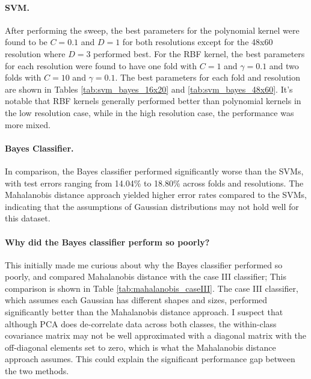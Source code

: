 \documentclass[12pt, letterpaper]{article}
\begin{document}
\paragraph{SVM.}
After performing the sweep, the best parameters for the polynomial kernel were found to be $C=0.1$ and $D=1$ for both resolutions except for the 48x60
resolution where $D=3$ performed best.
For the RBF kernel, the best parameters for each resolution were found to have one fold with $C=1$ and $\gamma=0.1$ and two folds with $C=10$ and $\gamma=0.1$.
The best parameters for each fold and resolution are shown in Tables \ref{tab:svm_bayes_16x20} and \ref{tab:svm_bayes_48x60}.
It's notable that RBF kernels generally performed better than polynomial kernels in the low resolution case, while in the high resolution case, the performance was more mixed.

\paragraph{Bayes Classifier.}
In comparison, the Bayes classifier performed significantly worse than the SVMs, with test errors ranging from 14.04\% to 18.80\% across folds and resolutions.
The Mahalanobis distance approach yielded higher error rates compared to the SVMs, indicating that the assumptions of Gaussian distributions may not hold well for
this dataset.

\paragraph{Why did the Bayes classifier perform so poorly?}
This initially made me curious about why the Bayes classifier performed so poorly, and compared Mahalanobis distance with the case III classifier; This
comparison is shown in Table \ref{tab:mahalanobis_caseIII}. The case III classifier, which assumes each Gaussian has different shapes and sizes, performed significantly better
than the Mahalanobis distance approach. I suspect that although PCA does de-correlate data across both classes, the within-class covariance matrix may not be well
approximated with a diagonal matrix with the off-diagonal elements set to zero, which is what the Mahalanobis distance approach assumes. This could explain the significant
performance gap between the two methods.
\end{document}
